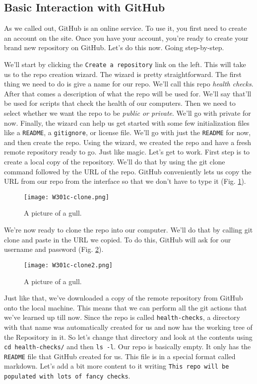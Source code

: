 \subsection{Basic Interaction with GitHub} \label{W301c}

As we called out, GitHub is an online service. To use it, you first need to create an account on the site. Once you have your account, you're ready to create your brand new repository on GitHub. Let's do this now. Going step-by-step.

We'll start by clicking the \verb|Create a repository| link on the left. This will take us to the repo creation wizard. The wizard is pretty straightforward. The first thing we need to do is give a name for our repo. We'll call this repo \textit{health checks}. After that comes a description of what the repo will be used for. We'll say that'll be used for scripts that check the health of our computers. Then we need to select whether we want the repo to be \textit{public or private}. We'll go with private for now. 
Finally, the wizard can help us get started with some few initialization files like a \verb|README|, a \verb|gitignore|, or license file. We'll go with just the \verb|README| for now, and then create the repo. 
Using the wizard, we created the repo and have a fresh remote repository ready to go. Just like magic. 
Let's get to work. First step is to create a local copy of the repository. 
We'll do that by using the git clone command followed by the URL of the repo. 
GitHub conveniently lets us copy the URL from our repo from the interface so that we don't have to type it (Fig. \ref{W301c-clone}).

\begin{figure} 
	\caption{A picture of a gull.}
	\centering
	\texttt{[image: W301c-clone.png]}
	\label{W301c-clone}
\end{figure}


We're now ready to clone the repo into our computer. We'll do that by calling git clone and paste in the URL we copied. To do this, GitHub will ask for our username and password (Fig. \ref{W301c-clone2}).

\begin{figure} 
	\caption{A picture of a gull.}
	\centering
	\texttt{[image: W301c-clone2.png]}
	\label{W301c-clone2}
\end{figure}

Just like that, we've downloaded a copy of the remote repository from GitHub onto the local machine. This means that we can perform all the git actions that we've learned up till now. Since the repo is called \verb|health-checks|, a directory with that name was automatically created for us and now has the working tree of the Repository in it. So let's change that directory and look at the contents using \verb|cd health-checks/| and then \verb|ls -l|. Our repo is basically empty. It only has the \verb|README| file that GitHub created for us. This file is in a special format called markdown. Let's add a bit more content to it writing \verb|This repo will be populated with lots of fancy checks|. 

